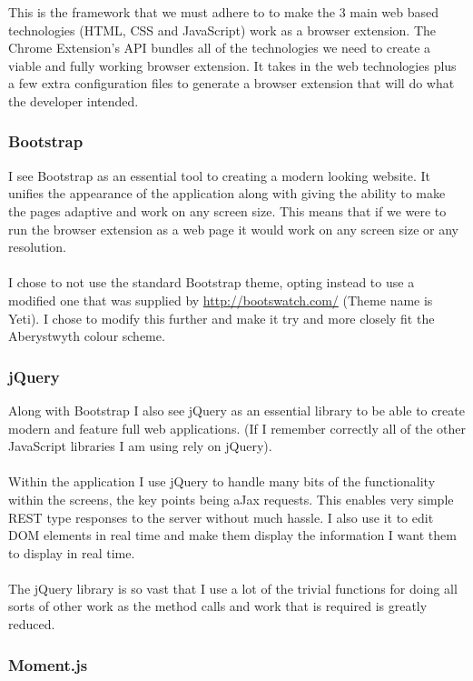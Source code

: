 \documentclass{article}
\begin{document}
This is the framework that we must adhere to to make the 3 main web based technologies (HTML, CSS and JavaScript) work as a browser extension. The Chrome Extension's API bundles all of the technologies we need to create a viable and fully working browser extension. It takes in the web technologies plus a few extra configuration files to generate a browser extension that will do what the developer intended.

\subsubsection{Bootstrap}

I see Bootstrap as an essential tool to creating a modern looking website. It unifies the appearance of the application along with giving the ability to make the pages adaptive and work on any screen size. This means that if we were to run the browser extension as a web page it would work on any screen size or any resolution.\\
\\
I chose to not use the standard Bootstrap theme, opting instead to use a modified one that was supplied by \url{http://bootswatch.com/} (Theme name is Yeti). I chose to modify this further and make it try and more closely fit the Aberystwyth colour scheme.

\subsubsection{jQuery}

Along with Bootstrap I also see jQuery as an essential library to be able to create modern and feature full web applications. (If I remember correctly all of the other JavaScript libraries I am using rely on jQuery).\\
\\
Within the application I use jQuery to handle many bits of the functionality within the screens, the key points being aJax requests. This enables very simple REST type responses to the server without much hassle. I also use it to edit DOM elements in real time and make them display the information I want them to display in real time.\\
\\
The jQuery library is so vast that I use a lot of the trivial functions for doing all sorts of other work as the method calls and work that is required is greatly reduced.

\subsubsection{Moment.js}
\end{document}
